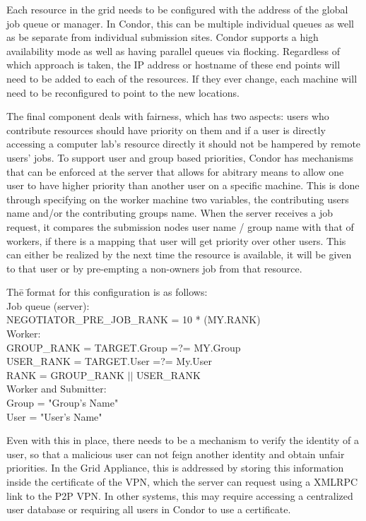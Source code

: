 \documentclass[conference]{IEEEtran}
\begin{document}
Each resource in the grid needs to be configured with the address of the global
job queue or manager.  In Condor, this can be multiple individual queues as
well as be separate from individual submission sites.  Condor supports a high
availability mode as well as having parallel queues via flocking.  Regardless
of which approach is taken, the IP address or hostname of these end points will
need to be added to each of the resources.  If they ever change, each machine
will need to be reconfigured to point to the new locations.

The final component deals with fairness, which has two aspects:  users who
contribute resources should have priority on them and if a user is directly
accessing a computer lab's resource directly it should not be hampered by
remote users' jobs.  To support user and group based priorities, Condor has
mechanisms that can be enforced at the server that allows for abitrary means to
allow one user to have higher priority than another user on a specific machine.
This is done through specifying on the worker machine two variables, the
contributing users name and/or the contributing groups name.  When the server
receives a job request, it compares the submission nodes user name / group name
with that of workers, if there is a mapping that user will get priority over
other users.  This can either be realized by the next time the resource is
available, it will be given to that user or by pre-empting a non-owners job
from that resource.

\begin{tabbing}
Th\=e \=format for this configuration is as follows:\\
\> Job queue (server):\\
\> \> NEGOTIATOR\_PRE\_JOB\_RANK = 10 * (MY.RANK) \\
\> Worker:\\
\> \> GROUP\_RANK = TARGET.Group =?= MY.Group \\
\> \> USER\_RANK = TARGET.User =?= My.User \\
\> \> RANK = GROUP\_RANK $\vert\vert$ USER\_RANK \\
\>  Worker and Submitter:\\
\> \> Group = "Group's Name"\\
\> \> User = "User's Name"
\end{tabbing}

Even with this in place, there needs to be a mechanism to verify the identity
of a user, so that a malicious user can not feign another identity and obtain
unfair priorities.  In the Grid Appliance, this is addressed by storing this
information inside the certificate of the VPN, which the server can request
using a XMLRPC link to the P2P VPN.  In other systems, this may require
accessing a centralized user database or requiring all users in Condor to use a
certificate.
\end{document}
